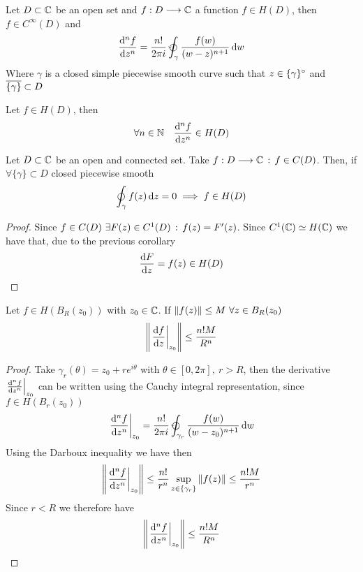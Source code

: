 \documentclass[../complete.tex]{subfiles}
\begin{document}
\begin{thm}
	Let $D\subset\mathbb{C}$ be an open set and $f:D\overset{}{\longrightarrow}\mathbb{C}$ a function $f\in H(D)$, then $f\in C^{\infty}(D)$ and
	\begin{equation}
		\derivative[n]{f}{z}=\frac{n!}{2\pi i}\ointccw_{\gamma}\frac{f(w)}{(w-z)^{n+1}}\diff w
		\label{eq:derivativeintrep}
	\end{equation}
	Where $\gamma$ is a closed simple piecewise smooth curve such that $z\in\{\gamma\}^{\circ}$ and $\overline{\{\gamma\}}\subset D$
\end{thm}
\begin{cor}
	Let $f\in H(D)$, then
	\begin{equation*}
		\forall n\in\N\quad\derivative[n]{f}{z}\in H(D)
	\end{equation*}
\end{cor}
\begin{thm}[Morera]
	Let $D\subset\mathbb{C}$ be an open and connected set. Take $f:D\overset{}{\longrightarrow}\mathbb{C}\, :\,  f\in C(D)$. Then, if $\forall\{\gamma\}\subset D$ closed piecewise smooth
	\begin{equation}
		\oint_\gamma f(z)\operatorname{d\!} z=0\implies f\in H(D)
		\label{eq:morera}
	\end{equation}
\end{thm}
\begin{proof}
	Since $f\in C(D)\ \exists F(z)\in C^1(D)\, :\,  f(z)=F'(z)$. Since $C^1(\mathbb{C})\simeq H(\mathbb{C})$ we have that, due to the previous corollary
	\begin{equation*}
		\derivative{F}{z}=f(z)\in H(D)
	\end{equation*}
\end{proof}
\begin{thm}
	Let $f\in H(B_R(z_0))$ with $z_0\in\mathbb{C}$. If $\norm{f(z)}\le M\ \forall z\in B_R(z_0)$
	\begin{equation}
		\norm{\left.\derivative{f}{z}\right|_{z_0}}\le\frac{n!M}{R^n}
			\label{eq:cauchyineq}
		\end{equation}
	\end{thm}
	\begin{proof}
		Take $\gamma_r(\theta)=z_0+re^{i\theta}$ with $\theta\in[0,2\pi],\ r>R$, then the derivative $\left.\derivative[n]{f}{z}\right|_{z_0}$ can be written using the Cauchy integral representation, since $f\in H(B_r(z_0))$
			\begin{equation*}
				\left.\derivative[n]{f}{z}\right|_{z_0}=\frac{n!}{2\pi i}\ointccw_{\gamma_r}\frac{f(w)}{(w-z_0)^{n+1}}\diff w
				\end{equation*}
				Using the Darboux inequality we have then
				\begin{equation*}
					\norm{\left.\derivative[n]{f}{z}\right|_{z_0}}\le\frac{n!}{r^n}\sup_{z\in\{\gamma_r\}}\norm{f(z)}\le\frac{n!M}{r^n}
					\end{equation*}
					Since $r<R$ we therefore have
					\begin{equation*}
						\norm{\left.\derivative[n]{f}{z}\right|_{z_0}}\le\frac{n!M}{R^n}
						\end{equation*}
					\end{proof}
\end{document}
